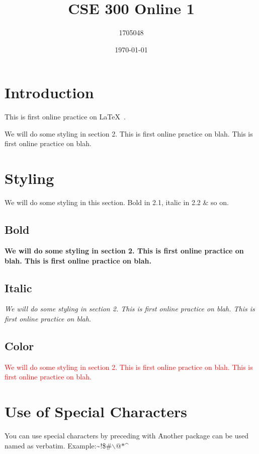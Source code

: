 \documentclass[14pt]{article}
\title{CSE 300 Online 1}
\author{1705048}
\date{\today}
\begin{document}
\maketitle
\tableofcontents
\pagebreak
\section{Introduction}
This is first online practice on \LaTeX\ . 

We will do some styling in section 2. This is first online practice on blah.  This is first online practice on blah.
\pagebreak
\section{Styling}
We will do some styling in this section. Bold in 2.1, italic in 2.2 \& so on.
\subsection{Bold}
\textbf{We will do some styling in section 2. This is first online practice on blah.  This is first online practice on blah.}
\subsection{Italic}
\textit{We will do some styling in section 2. This is first online practice on blah.  This is first online practice on blah.}
\subsection{Color}
\textcolor{red}{We will do some styling in section 2. This is first online practice on blah.  This is first online practice on blah.}
\pagebreak
\section*{Use of Special Characters}
You can use special characters by preceding with \. Another package can be used named as verbatim. Example:\~{}$!$\$\#$\backslash$$@$$*$\^{}
\end{document}

